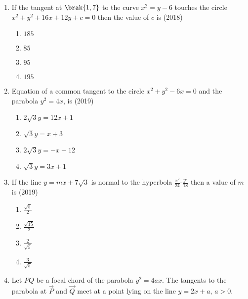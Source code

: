 \begin{enumerate}
     \hfill{( 2018)}
	\begin{multicols}{4}
\begin{enumerate}
    		\item $2$
    		\item $3$
    		\item $\frac{4}{3}$
    		\item $\frac{1}{2}$
	\end{enumerate}
\end{multicols}
\item If the tangent at $\brak{1,7}$ to the curve $x^2=y-6$ touches the circle $x^2+y^2+16x+12y+c=0$ then the value of $c$ is 
       \hfill{(2018)}
	\begin{multicols}{4}
\begin{enumerate}
    		\item $185$
    		\item $85$
    		\item $95$
    		\item $195$
	\end{enumerate}
\end{multicols} 
\item Equation of a common tangent to the circle $x^2+y^2-6x=0$ and the parabola $y^2=4x$, is
     \hfill{(2019)}
	\begin{multicols}{2}
\begin{enumerate}
    		\item $2\sqrt{3}y=12x+1$ 
    		\item $\sqrt{3}y=x+3$
    		\item $2\sqrt{3}y=-x-12$ 
    		\item $\sqrt{3}y=3x+1$
	\end{enumerate}
\end{multicols}   
\item If the line $y=mx+7\sqrt{3}$ is normal to the hyperbola $\frac{x^2}{24}$-$\frac{y^2}{18}$ then a value of $m$ is 
     \hfill{(2019)}
	\begin{multicols}{4}
\begin{enumerate}
    		\item $\frac{\sqrt{5}}{2}$ 
    		\item $\frac{\sqrt{15}}{2}$
    		\item $\frac{2}{\sqrt5}$
    		\item $\frac{3}{\sqrt5}$
	\end{enumerate}
\end{multicols}
\item Let $PQ$ be a focal chord of the parabola $y^2=4ax$. The tangents to the parabola at $\Vec{P}$ and $\Vec{Q}$ meet at a point lying on the line $y=2x+a$, $a>0$.

\end{enumerate}
